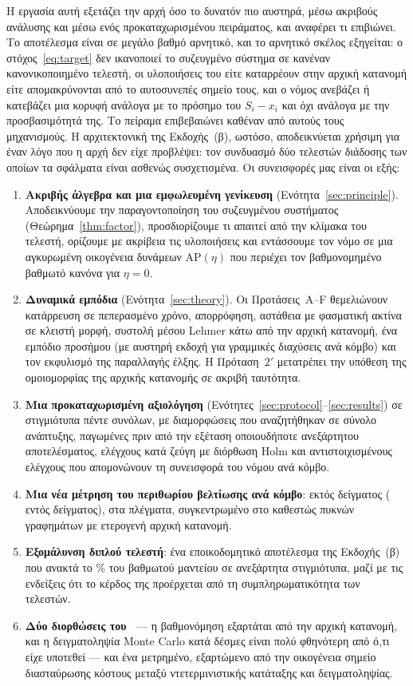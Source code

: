 \documentclass[11pt,a4paper]{article}
\theoremstyle{definition}
\theoremstyle{plain}
\newcommand{\AP}{\mathrm{AP}}
\begin{document}
Η εργασία αυτή εξετάζει την αρχή όσο το δυνατόν πιο αυστηρά, μέσω ακριβούς ανάλυσης και μέσω ενός προκαταχωρισμένου πειράματος, και αναφέρει τι επιβιώνει. Το αποτέλεσμα είναι σε μεγάλο βαθμό αρνητικό, και το αρνητικό σκέλος εξηγείται: ο στόχος~\eqref{eq:target} δεν ικανοποιεί το συζευγμένο σύστημα σε κανέναν κανονικοποιημένο τελεστή, οι υλοποιήσεις του είτε καταρρέουν στην αρχική κατανομή είτε απομακρύνονται από το αυτοσυνεπές σημείο τους, και ο νόμος ανεβάζει ή κατεβάζει μια κορυφή ανάλογα με το πρόσημο του $S_i-x_i$ και όχι ανάλογα με την προσβασιμότητά της. Το πείραμα επιβεβαιώνει καθέναν από αυτούς τους μηχανισμούς. Η αρχιτεκτονική της Εκδοχής~(β), ωστόσο, αποδεικνύεται χρήσιμη για έναν λόγο που η αρχή δεν είχε προβλέψει: τον συνδυασμό δύο τελεστών διάδοσης των οποίων τα σφάλματα είναι ασθενώς συσχετισμένα. Οι συνεισφορές μας είναι οι εξής:
\begin{enumerate}[label=(\roman*)]
\item \textbf{Ακριβής άλγεβρα και μια εμφωλευμένη γενίκευση} (Ενότητα~\ref{sec:principle}). Αποδεικνύουμε την παραγοντοποίηση του συζευγμένου συστήματος (Θεώρημα~\ref{thm:factor}), προσδιορίζουμε τι απαιτεί από την κλίμακα του τελεστή, ορίζουμε με ακρίβεια τις υλοποιήσεις και εντάσσουμε τον νόμο σε μια αγκυρωμένη οικογένεια δυνάμεων $\AP(\eta)$ που περιέχει τον βαθμονομημένο βαθμωτό κανόνα για $\eta=0$.
\item \textbf{Δυναμικά εμπόδια} (Ενότητα~\ref{sec:theory}). Οι Προτάσεις~A--F θεμελιώνουν κατάρρευση σε πεπερασμένο χρόνο, απορρόφηση, αστάθεια με φασματική ακτίνα σε κλειστή μορφή, συστολή μέσου Lehmer κάτω από την αρχική κατανομή, ένα εμπόδιο προσήμου (με αυστηρή εκδοχή για γραμμικές διαχύσεις ανά κόμβο) και τον εκφυλισμό της παραλλαγής έλξης. Η Πρόταση~$2'$ μετατρέπει την υπόθεση της ομοιομορφίας της αρχικής κατανομής σε ακριβή ταυτότητα.
\item \textbf{Μια προκαταχωρισμένη αξιολόγηση} (Ενότητες~\ref{sec:protocol}--\ref{sec:results}) σε \NTotal{} στιγμιότυπα πέντε συνόλων, με \CfgTotal{} διαμορφώσεις που αναζητήθηκαν σε σύνολο ανάπτυξης, \NFrozen{} παγωμένες πριν από την εξέταση οποιουδήποτε ανεξάρτητου αποτελέσματος, ελέγχους κατά ζεύγη με διόρθωση Holm και αντιστοιχισμένους ελέγχους που απομονώνουν τη συνεισφορά του νόμου ανά κόμβο.
\item \textbf{Μια νέα μέτρηση του περιθωρίου βελτίωσης ανά κόμβο}: \HeadAll{} εκτός δείγματος (\HeadApparent{} εντός δείγματος), \HeadGrid{} στα πλέγματα, συγκεντρωμένο στο καθεστώς πυκνών γραφημάτων με ετερογενή αρχική κατανομή.
\item \textbf{Εξομάλυνση διπλού τελεστή}: ένα εποικοδομητικό αποτέλεσμα της Εκδοχής~(β) που ανακτά το \TestLinNinePctOracle\% του βαθμωτού μαντείου σε ανεξάρτητα στιγμιότυπα, μαζί με τις ενδείξεις ότι το κέρδος της προέρχεται από τη συμπληρωματικότητα των τελεστών.
\item \textbf{Δύο διορθώσεις του~\cite{konstantellos26}} --- η βαθμονόμηση εξαρτάται από την αρχική κατανομή, και η δειγματοληψία Monte Carlo κατά δέσμες είναι πολύ φθηνότερη από ό,τι είχε υποτεθεί --- και ένα μετρημένο, εξαρτώμενο από την οικογένεια σημείο διασταύρωσης κόστους μεταξύ ντετερμινιστικής κατάταξης και δειγματοληψίας.
\end{enumerate}
\end{document}
